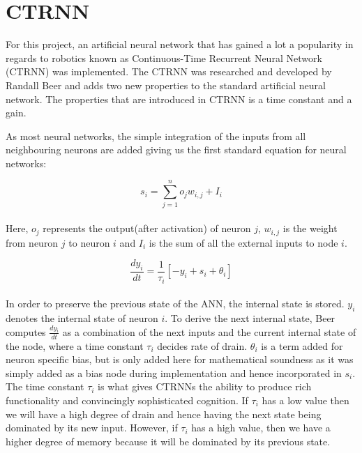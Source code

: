 \section{CTRNN}
For this project, an artificial neural network that has gained a lot a popularity in regards to robotics known as Continuous-Time Recurrent Neural Network (CTRNN) was implemented. 
The CTRNN was researched and developed by Randall Beer and adds two new properties to the standard artificial neural network. 
The properties that are introduced in CTRNN is a time constant and a gain.

As most neural networks, the simple integration of the inputs from all neighbouring neurons are added giving us the first standard equation for neural networks:

\begin{equation}
	s_i = \sum_{j=1}^{n}o_{j}w_{i,j}+I_i
\end{equation}
\\
Here, $o_j$ represents the output(after activation) of neuron $j$, $w_{i,j}$ is the weight from neuron $j$ to neuron $i$ and $I_i$ is the sum of all the external inputs to node $i$.

\begin{equation}
\frac{dy_i}{dt} = \frac{1}{\tau_i}[-y_i + s_i + \theta_i]
\end{equation}
\\
In order to preserve the previous state of the ANN, the internal state is stored. 
$y_i$ denotes the internal state of neuron $i$.
To derive the next internal state, Beer computes $\frac{dy_i}{dt}$ as a combination of the next inputs and the current internal state of the node, where a time constant $\tau_i$ decides rate of drain. 
$\theta_i$ is a term added for neuron specific bias, but is only added here for mathematical soundness as it was simply added as a bias node during implementation and hence incorporated in $s_i$.
The time constant $\tau_i$ is what gives CTRNNs the ability to produce rich functionality and convincingly sophisticated cognition.
If $\tau_i$ has a low value then we will have a high degree of drain and hence having the next state being dominated by its new input.
However, if $\tau_i$ has a high value, then we have a higher degree of memory because it will be dominated by its previous state.

